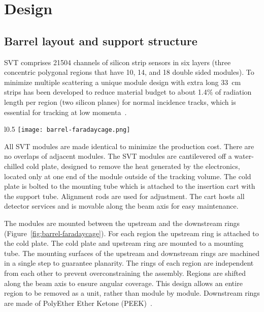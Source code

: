 \section{Design}

\subsection{Barrel layout and support structure}

SVT comprises 21504 channels of silicon strip sensors in six layers (three concentric polygonal regions that have 10, 14, and 18 double sided modules). 
To minimize multiple scattering a unique module design with extra long 33~cm strips has been developed to reduce material budget to about 1.4$\%$ of radiation length per region (two silicon planes) for normal incidence tracks, which is essential for tracking at low momenta~\cite{Vertex2016}. 

\begin{wrapfigure}{l}{0.5\columnwidth}
\centering 
\texttt{[image: barrel-faradaycage.png]}
\caption{Layout of the barrel and the Faraday Cage. Copper supports shown in yellow.  Supports are bolted directly to cold plate. Silicon sensors are shown in green.}
\label{fig:barrel-faradaycage}
\end{wrapfigure}

All SVT modules are made identical to minimize the production cost. There are no overlaps of adjacent modules. The SVT modules are cantilevered off a water-chilled cold plate, designed to remove the heat generated by the electronics, located only at one end of the module outside of the tracking volume. The cold plate is bolted to the mounting tube which is attached to the insertion cart with the support tube. Alignment rods are used for adjustment. The cart hosts all detector services and is movable along the beam axis for easy maintenance.



The modules  are mounted between the upstream and the downstream rings (Figure~\ref{fig:barrel-faradaycage}). For each region the upstream ring is attached to the cold plate. The cold plate and upstream ring are mounted to a mounting tube. The mounting surfaces of the upstream and downstream rings are machined in a single step to guarantee planarity. The rings of each region are independent from each other to prevent overconstraining the assembly.  Regions are shifted along the beam axis to ensure angular coverage. This design allows an entire region to be removed as a unit, rather than module by module. Downstream rings are made of PolyEther Ether Ketone (PEEK)~\cite{NIMVCC}. 

